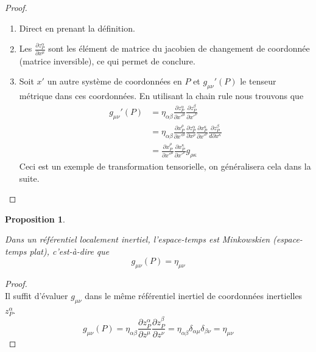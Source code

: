 \documentclass[a4paper,11pt]{report}
\theoremstyle{definition}
\theoremstyle{plain}
\newtheorem{prop}[thm]{Proposition}
\theoremstyle{definition}
\theoremstyle{remark}
\newcommand{\p}{\partial}
\begin{document}
            \begin{proof}
                \begin{enumerate}[label = \textit{\roman*)}]
                    \item Direct en prenant la définition.
                    \item Les $\frac{\p z^\alpha_P}{\p x^\mu}$ sont les élément de matrice du jacobien de changement de coordonnée (matrice inversible), ce qui permet de conclure.
                    \item Soit $x'$ un autre système de coordonnées en $P$ et $g_{\mu\nu}'(P)$ le tenseur métrique dans ces coordonnées. En utilisant la chain rule nous trouvons que
                    \begin{align}
                        g_{\mu\nu}'(P) &= \eta_{\alpha\beta}\frac{\p z^\alpha_P}{ \p x'^\mu}\frac{\p z^\beta_P}{\p x'^\nu}\\
                        &= \eta_{\alpha\beta}\frac{\p x^\rho_P}{ \p x'^\mu}\frac{\p z^\alpha_P}{\p x^\rho}\frac{\p x^\kappa_P}{ \p x'^\nu}\frac{\p z^\beta_P}{d\p x^\kappa} \\
                        &= \frac{\p x^\rho_P}{ \p x'^\mu}\frac{\p x^\kappa_P}{ \p x'^\nu}g_{\rho\kappa}
                    \end{align}
                    Ceci est un exemple de transformation tensorielle, on généralisera cela dans la suite.
                \end{enumerate}
            \end{proof}
            
            \begin{prop}\begin{leftbar}
                Dans un référentiel localement inertiel, l'espace-temps est Minkowskien (espace-temps plat), c'est-à-dire que
                \begin{equation}
                    g_{\mu\nu}(P) = \eta_{\mu\nu}
                \end{equation}
            \end{leftbar}\end{prop}
            
            \begin{proof}
            ${}$\\
                Il suffit d'évaluer $g_{\mu\nu}$ dans le même référentiel inertiel de coordonnées inertielles $z^\alpha_P$.
                \begin{equation}
                    g_{\mu\nu}(P) = \eta_{\alpha\beta}\frac{\p z^\alpha_P}{ \p z^\mu}\frac{\p z^\beta_P}{\p z^\nu} =  \eta_{\alpha\beta}\delta_{\alpha\mu}\delta_{\beta\nu} = \eta_{\mu\nu}
                \end{equation}
            \end{proof}
            
\end{document}
